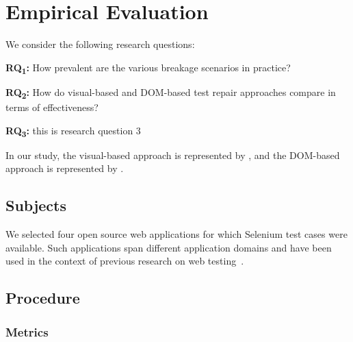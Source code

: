 
\section{Empirical Evaluation}\label{sec:evaluation}

We consider the following research questions:

\noindent
\textbf{RQ\textsubscript{1}:} How prevalent are the various breakage scenarios in practice?

\noindent
\textbf{RQ\textsubscript{2}:} How do visual-based and DOM-based test repair approaches compare in terms of effectiveness?

\noindent%
\textbf{RQ\textsubscript{3}:} this is research question 3

\noindent
In our study, the visual-based approach is represented by \tool, and the DOM-based approach is represented by \water.

\subsection{Subjects}\label{sec:subjects}

We selected four open source web applications for which Selenium test cases were available. Such applications span different application domains and have been used in the context of previous research on web testing~\cite{}.

\subsection{Procedure}\label{sec:procedure}

\subsubsection{Metrics}

